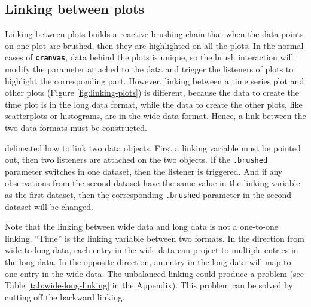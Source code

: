\documentclass[12pt]{article}
\begin{document}


\subsection{Linking between plots}

Linking between plots builds a reactive brushing chain that
when the data points on one plot are brushed, then they are
highlighted on all the plots. In the normal cases of
\texttt{\textbf{cranvas}}, data behind the plots is unique,
so the brush interaction will modify the parameter attached
to the data and trigger the listeners of plots to highlight
the corresponding part. However, linking between a time
series plot and other plots (Figure \ref{fig:linking-plots}) is different, because the
data to create the time plot is in the long data format,
while the data to create the other plots, like scatterplots
or histograms, are in the wide data format. Hence, a link
between the two data formats must be constructed.

\citet{xie2014reactive} delineated how to link two data
objects. First a linking variable must be pointed out, then two listeners
are attached on the two objects. If the \texttt{.brushed} parameter
switches in one dataset, then the listener is triggered. And if any
observations from the second dataset have the same value in the linking
variable as the first dataset, then the corresponding \texttt{.brushed}
parameter in the second dataset will be changed.

Note that the linking between wide data and long data is not a one-to-one
linking. ``Time'' is the linking variable between two formats.
In the direction from wide to long data, each entry in the
wide data can project to multiple entries in the long data. In the
opposite direction, an entry in the long data will map to one entry in
the wide data. The unbalanced linking could produce a problem (see 
Table \ref{tab:wide-long-linking} in the Appendix). This problem can be solved by cutting off the backward linking.
\end{document}
